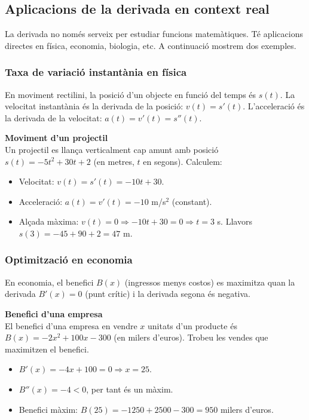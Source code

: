 \documentclass[12pt]{article}
\begin{document}
\subsection{Aplicacions de la derivada en context real}

\begin{concept} La derivada no només serveix per estudiar funcions matemàtiques. Té aplicacions directes en física, economia, biologia, etc. A continuació mostrem dos exemples.

\subsubsection*{Taxa de variació instantània en física}

En moviment rectilini, la posició d'un objecte en funció del temps és $s(t)$. La velocitat instantània és la derivada de la posició: $v(t)=s'(t)$. L'acceleració és la derivada de la velocitat: $a(t)=v'(t)=s''(t)$.
\end{concept}

\begin{exemple}
\textbf{Moviment d'un projectil}\\
Un projectil es llança verticalment cap amunt amb posició $s(t)= -5t^2 + 30t + 2$ (en metres, $t$ en segons). Calculem:
\begin{itemize}
    \item Velocitat: $v(t)=s'(t)=-10t+30$.
    \item Acceleració: $a(t)=v'(t)=-10$ m/s$^2$ (constant).
    \item Alçada màxima: $v(t)=0 \Rightarrow -10t+30=0 \Rightarrow t=3$ s. Llavors $s(3)=-45+90+2=47$ m.
\end{itemize}
\end{exemple}

\subsubsection*{Optimització en economia}

En economia, el benefici $B(x)$ (ingressos menys costos) es maximitza quan la derivada $B'(x)=0$ (punt crític) i la derivada segona és negativa.

\begin{exemple}
\textbf{Benefici d'una empresa}\\
El benefici d'una empresa en vendre $x$ unitats d'un producte és $B(x)=-2x^2+100x-300$ (en milers d'euros). Trobeu les vendes que maximitzen el benefici.
\begin{itemize}
    \item $B'(x)=-4x+100=0 \Rightarrow x=25$.
    \item $B''(x)=-4<0$, per tant és un màxim.
    \item Benefici màxim: $B(25)=-1250+2500-300=950$ milers d'euros.
\end{itemize}
\end{exemple}
\end{document}
